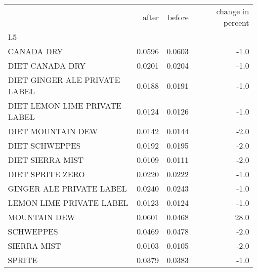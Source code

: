 \begin{tabular}{lrrr}
\toprule
{} &   after &  before &  change in percent \\
L5                            &         &         &                    \\
\midrule
CANADA DRY                    &  0.0596 &  0.0603 &               -1.0 \\
DIET CANADA DRY               &  0.0201 &  0.0204 &               -1.0 \\
DIET GINGER ALE PRIVATE LABEL &  0.0188 &  0.0191 &               -1.0 \\
DIET LEMON LIME PRIVATE LABEL &  0.0124 &  0.0126 &               -1.0 \\
DIET MOUNTAIN DEW             &  0.0142 &  0.0144 &               -2.0 \\
DIET SCHWEPPES                &  0.0192 &  0.0195 &               -2.0 \\
DIET SIERRA MIST              &  0.0109 &  0.0111 &               -2.0 \\
DIET SPRITE ZERO              &  0.0220 &  0.0222 &               -1.0 \\
GINGER ALE PRIVATE LABEL      &  0.0240 &  0.0243 &               -1.0 \\
LEMON LIME PRIVATE LABEL      &  0.0123 &  0.0124 &               -1.0 \\
MOUNTAIN DEW                  &  0.0601 &  0.0468 &               28.0 \\
SCHWEPPES                     &  0.0469 &  0.0478 &               -2.0 \\
SIERRA MIST                   &  0.0103 &  0.0105 &               -2.0 \\
SPRITE                        &  0.0379 &  0.0383 &               -1.0 \\
\bottomrule
\end{tabular}
